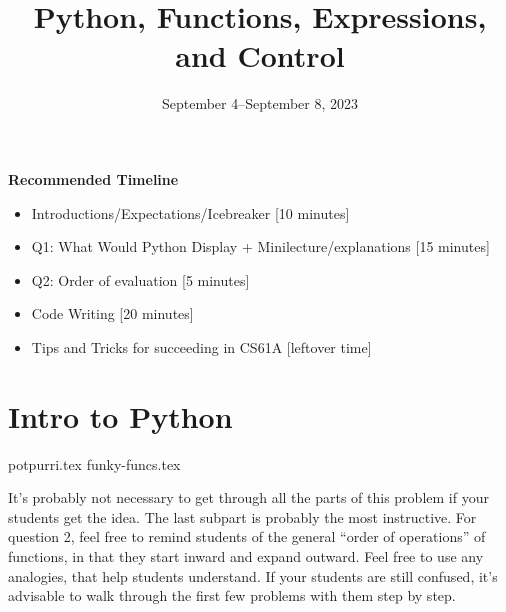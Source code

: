 \documentclass{exam}
\title{Python, Functions, Expressions, and Control}
\date{September 4--September 8, 2023}
\begin{document}
\maketitle
\begin{meta}
\textbf{Recommended Timeline}
\begin{itemize}
  \item Introductions/Expectations/Icebreaker [10 minutes]
  \item Q1: What Would Python Display + Minilecture/explanations [15 minutes]
  \item Q2: Order of evaluation [5 minutes]
  \item Code Writing [20 minutes]
  \item Tips and Tricks for succeeding in CS61A [leftover time]
\end{itemize}
\end{meta}


\section{Intro to Python}
\begin{questions}
{potpurri.tex}
{funky-funcs.tex}
\begin{questionmeta}
  It's probably not necessary to get through all the parts of this problem if your students get the idea. The last subpart is probably the most instructive. 
  For question 2, feel free to remind students of the general ``order of operations'' of functions, in that they start inward and expand outward. Feel free to use any analogies, that help students understand.
  If your students are still confused, it's advisable to walk through the first few problems with them step by step.
\end{questionmeta}
\end{questions}
\end{document}
